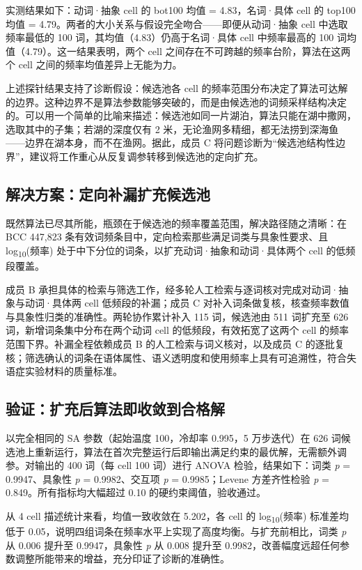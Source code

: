 \documentclass[12pt, a4paper]{article}
\begin{document}
实测结果如下：动词·抽象 cell 的 bot100 均值 = 4.83，名词·具体 cell 的 top100 均值 = 4.79。两者的大小关系与假设完全吻合——即便从动词·抽象 cell 中选取频率最低的 100 词，其均值（4.83）仍高于名词·具体 cell 中频率最高的 100 词均值（4.79）。这一结果表明，两个 cell 之间存在不可跨越的频率台阶，算法在这两个 cell 之间的频率均值差异上无能为力。

上述探针结果支持了诊断假设：候选池各 cell 的频率范围分布决定了算法可达解的边界。这种边界不是算法参数能够突破的，而是由候选池的词频采样结构决定的。可以用一个简单的比喻来描述：候选池如同一片湖泊，算法只能在湖中撒网，选取其中的子集；若湖的深度仅有 2 米，无论渔网多精细，都无法捞到深海鱼——边界在湖本身，而不在渔网。据此，成员 C 将问题诊断为“候选池结构性边界”，建议将工作重心从反复调参转移到候选池的定向扩充。

\subsection{解决方案：定向补漏扩充候选池}

既然算法已尽其所能，瓶颈在于候选池的频率覆盖范围，解决路径随之清晰：在 BCC 447,823 条有效词频条目中，定向检索那些满足词类与具象性要求、且 log\textsubscript{10}(频率) 处于中下分位的词条，以扩充动词·抽象和动词·具体两个 cell 的低频段覆盖。

成员 B 承担具体的检索与筛选工作，经多轮人工检索与逐词核对完成对动词·抽象与动词·具体两 cell 低频段的补漏；成员 C 对补入词条做复核，核查频率数值与具象性归类的准确性。两轮协作累计补入 115 词，候选池由 511 词扩充至 626 词，新增词条集中分布在两个动词 cell 的低频段，有效拓宽了这两个 cell 的频率范围下界。补漏全程依赖成员 B 的人工检索与词义核对，以及成员 C 的逐批复核；筛选确认的词条在语体属性、语义透明度和使用频率上具有可追溯性，符合失语症实验材料的质量标准。

\subsection{验证：扩充后算法即收敛到合格解}

以完全相同的 SA 参数（起始温度 100，冷却率 0.995，5 万步迭代）在 626 词候选池上重新运行，算法在首次完整运行后即输出满足约束的最优解，无需额外调参。对输出的 400 词（每 cell 100 词）进行 ANOVA 检验，结果如下：词类 \textit{p} = 0.9947、具象性 \textit{p} = 0.9982、交互项 \textit{p} = 0.9985；Levene 方差齐性检验 \textit{p} = 0.849。所有指标均大幅超过 0.10 的硬约束阈值，验收通过。

从 4 cell 描述统计来看，均值一致收敛在 5.202，各 cell 的 log\textsubscript{10}(频率) 标准差均低于 0.05，说明四组词条在频率水平上实现了高度均衡。与扩充前相比，词类 \textit{p} 从 0.006 提升至 0.9947，具象性 \textit{p} 从 0.008 提升至 0.9982，改善幅度远超任何参数调整所能带来的增益，充分印证了诊断的准确性。
\end{document}

